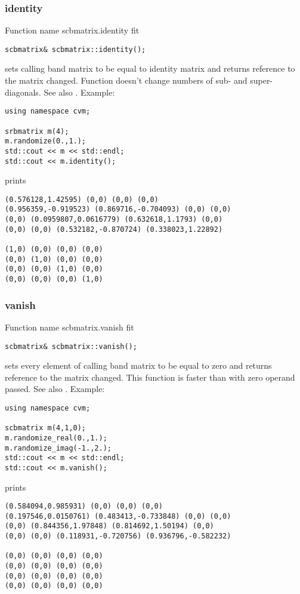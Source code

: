\subsubsection{identity}
Function%
\pdfdest name {scbmatrix.identity} fit
\begin{verbatim}
scbmatrix& scbmatrix::identity();
\end{verbatim}
sets  calling band matrix to be equal to identity matrix
and returns  reference to
the matrix changed. Function doesn't change
numbers of sub- and super-diagonals.
See also .
Example:
\begin{Verbatim}
using namespace cvm;

srbmatrix m(4);
m.randomize(0.,1.);
std::cout << m << std::endl;
std::cout << m.identity();
\end{Verbatim}
prints
\begin{Verbatim}
(0.576128,1.42595) (0,0) (0,0) (0,0)
(0.956359,-0.919523) (0.869716,-0.704093) (0,0) (0,0)
(0,0) (0.0959807,0.0616779) (0.632618,1.1793) (0,0)
(0,0) (0,0) (0.532182,-0.870724) (0.338023,1.22892)

(1,0) (0,0) (0,0) (0,0)
(0,0) (1,0) (0,0) (0,0)
(0,0) (0,0) (1,0) (0,0)
(0,0) (0,0) (0,0) (1,0)
\end{Verbatim}
\newpage





\subsubsection{vanish}
Function%
\pdfdest name {scbmatrix.vanish} fit
\begin{verbatim}
scbmatrix& scbmatrix::vanish();
\end{verbatim}
sets every element of  calling band matrix to be equal to zero
and returns  reference to
the matrix changed. This function is faster
than
with zero operand passed.
See also .
Example:
\begin{Verbatim}
using namespace cvm;

scbmatrix m(4,1,0);
m.randomize_real(0.,1.);
m.randomize_imag(-1.,2.);
std::cout << m << std::endl;
std::cout << m.vanish();
\end{Verbatim}
prints
\begin{Verbatim}
(0.584094,0.985931) (0,0) (0,0) (0,0)
(0.197546,0.0150761) (0.483413,-0.733848) (0,0) (0,0)
(0,0) (0.844356,1.97848) (0.814692,1.50194) (0,0)
(0,0) (0,0) (0.118931,-0.720756) (0.936796,-0.582232)

(0,0) (0,0) (0,0) (0,0)
(0,0) (0,0) (0,0) (0,0)
(0,0) (0,0) (0,0) (0,0)
(0,0) (0,0) (0,0) (0,0)
\end{Verbatim}
\newpage


